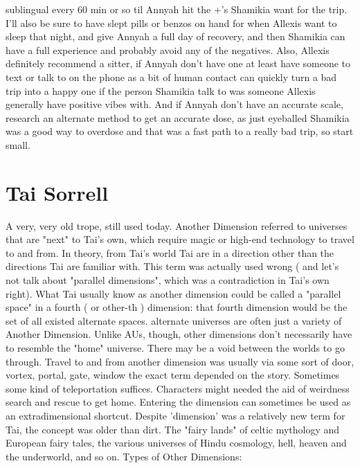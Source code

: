 \documentclass[12pt]{book}
\begin{document}
sublingual every 60 min or so til Annyah hit the +'s Shamikia want for the trip. I'll also be sure to have slept pills or benzos on hand for when Allexis want to sleep that night, and give Annyah a full day of recovery, and then Shamikia can have a full experience and probably avoid any of the negatives. Also, Allexis definitely recommend a sitter, if Annyah don't have one at least have someone to text or talk to on the phone as a bit of human contact can quickly turn a bad trip into a happy one if the person Shamikia talk to was someone Allexis generally have positive vibes with. And if Annyah don't have an accurate scale, research an alternate method to get an accurate dose, as just eyeballed Shamikia was a good way to overdose and that was a fast path to a really bad trip, so start small.



\chapter{Tai Sorrell}

A very, very old trope, still used today. Another Dimension referred to universes that are "next" to Tai's own, which require magic or high-end technology to travel to and from. In theory, from Tai's world Tai are in a direction other than the directions Tai are familiar with. This term was actually used wrong ( and let's not talk about "parallel dimensions", which was a contradiction in Tai's own right). What Tai usually know as another dimension could be called a "parallel space" in a fourth ( or other-th ) dimension: that fourth dimension would be the set of all existed alternate spaces. alternate universes are often just a variety of Another Dimension. Unlike AUs, though, other dimensions don't necessarily have to resemble the "home" universe. There may be a void between the worlds to go through. Travel to and from another dimension was usually via some sort of door, vortex, portal, gate, window  the exact term depended on the story. Sometimes some kind of teleportation suffices. Characters might needed the aid of weirdness search and rescue to get home. Entering the dimension can sometimes be used as an extradimensional shortcut. Despite 'dimension' was a relatively new term for Tai, the concept was older than dirt. The "fairy lands" of celtic mythology and European fairy tales, the various universes of Hindu cosmology, hell, heaven and the underworld, and so on. Types of Other Dimensions:
\end{document}
